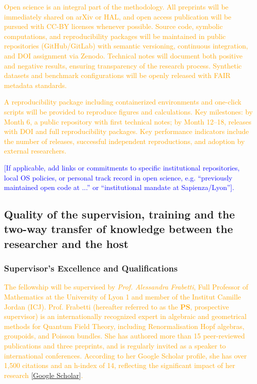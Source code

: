 \documentclass[11pt,draftproposal]{msca-pf}
\begin{document}
\textcolor{orange}{Open science is an integral part of the methodology. All preprints will be immediately shared on arXiv or HAL, and open access publication will be pursued with CC-BY licenses whenever possible. Source code, symbolic computations, and reproducibility packages will be maintained in public repositories (GitHub/GitLab) with semantic versioning, continuous integration, and DOI assignment via Zenodo. Technical notes will document both positive and negative results, ensuring transparency of the research process. Synthetic datasets and benchmark configurations will be openly released with FAIR metadata standards.}

\textcolor{orange}{A reproducibility package including containerized environments and one-click scripts will be provided to reproduce figures and calculations. Key milestones: by Month 6, a public repository with first technical notes; by Month 12–18, releases with DOI and full reproducibility packages. Key performance indicators include the number of releases, successful independent reproductions, and adoption by external researchers.}

\textcolor{blue}{[If applicable, add links or commitments to specific institutional repositories, local OS policies, or personal track record in open science, e.g. ``previously maintained open code at ...'' or ``institutional mandate at Sapienza/Lyon''].}


\subsection{Quality of the supervision, training and the two-way transfer of
    knowledge between the researcher and the host}
\label{ssc:excellence: supervision}


\subsubsection*{Supervisor’s Excellence and Qualifications}

\textcolor{orange}{The fellowship will be supervised by \emph{Prof. Alessandra Frabetti}, Full Professor of Mathematics at the University of Lyon 1 and member of the Institut Camille Jordan (ICJ). Prof. Frabetti (hereafter referred to as the \textbf{PS}, prospective supervisor) is an internationally recognized expert in algebraic and geometrical methods for Quantum Field Theory, including Renormalisation Hopf algebras, groupoids, and Poisson bundles. She has authored more than 15 peer-reviewed publications and three preprints, and is regularly invited as a speaker to international conferences. According to her Google Scholar profile, she has over 1,500 citations and an h-index of 14, reflecting the significant impact of her research \href{https://scholar.google.com/citations?user=d5_OM3wAAAAJ&hl=it&oi=ao}{[Google Scholar]}.}  
\end{document}
